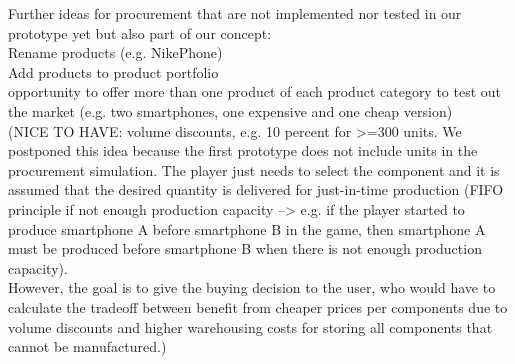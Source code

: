 Further ideas for procurement that are not implemented nor tested in our prototype yet but also part of our concept: \\
Rename products (e.g. NikePhone) \\
Add products to product portfolio \\
opportunity to offer more than one product of each product category to test out the market (e.g. two smartphones, one expensive and one cheap version)\\
(NICE TO HAVE: volume discounts, e.g. 10 percent for >=300 units. We postponed this idea because the first prototype does not include units in the procurement simulation. The player just needs to select the component and it is assumed that the desired quantity is delivered for just-in-time production (FIFO principle if not enough production capacity --> e.g. if the player started to produce smartphone A before smartphone B in the game, then smartphone A must be produced before smartphone B when there is not enough production capacity). \\
However, the goal is to give the buying decision to the user, who would have to calculate the tradeoff between benefit from cheaper prices per components due to volume discounts and higher warehousing costs for storing all components that cannot be manufactured.)